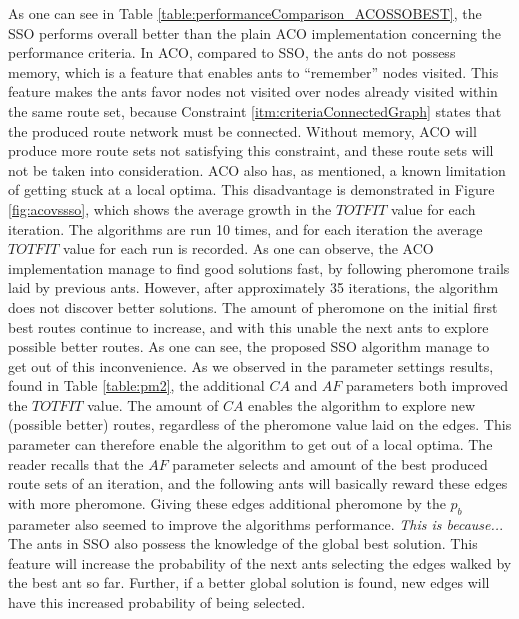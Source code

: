 As one can see in Table \vref{table:performanceComparison_ACOSSOBEST}, the SSO performs overall better than the plain ACO implementation concerning the performance criteria. In ACO, compared to SSO, the ants do not possess memory, which is a feature that enables ants to ``remember'' nodes visited. This feature makes the ants favor nodes not visited over nodes already visited within the same route set, because Constraint \vref{itm:criteriaConnectedGraph} states that the produced route network must be connected. Without memory, ACO will produce more route sets not satisfying this constraint, and these route sets will not be taken into consideration. ACO also has, as mentioned, a known limitation of getting stuck at a local optima. This disadvantage is demonstrated in Figure \ref{fig:acovssso}, which shows the average growth in the $TOTFIT$ value for each iteration. The algorithms are run 10 times, and for each iteration the average $TOTFIT$ value for each run is recorded. As one can observe, the ACO implementation manage to find good solutions fast, by following pheromone trails laid by previous ants. However, after approximately 35 iterations, the algorithm does not discover better solutions. The amount of pheromone on the initial first best routes continue to increase, and with this unable the next ants to explore possible better routes. As one can see, the proposed SSO algorithm manage to get out of this inconvenience. As we observed in the parameter settings results, found in Table \vref{table:pm2}, the additional $CA$ and $AF$ parameters both improved the $TOTFIT$ value. The amount of $CA$ enables the algorithm to explore new (possible better) routes, regardless of the pheromone value laid on the edges. This parameter can therefore enable the algorithm to get out of a local optima. The reader recalls that the $AF$ parameter selects and amount of the best produced route sets of an iteration, and the following ants will basically reward these edges with more pheromone. Giving these edges additional pheromone by the $p_b$ parameter also seemed to improve the algorithms performance. \emph{\color{blue}This is because..}. The ants in SSO also possess the knowledge of the global best solution. This feature will increase the probability of the next ants selecting the edges walked by the best ant so far. Further, if a better global solution is found, new edges will have this increased probability of being selected.

